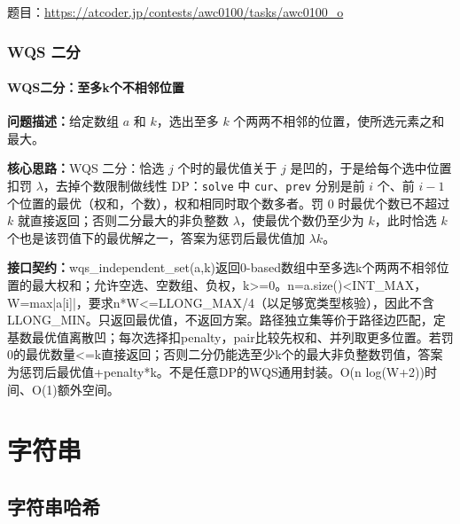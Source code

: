 题目：\url{https://atcoder.jp/contests/awc0100/tasks/awc0100_o}



\Needspace{532pt}

\section{WQS 二分}

\subsection{WQS二分：至多k个不相邻位置}\label{compact-wqs_independent_set}

\noindent\textbf{问题描述：}\allowbreak 给定数组 $a$ 和 $k$，选出至多 $k$ 个两两不相邻的位置，使所选元素之和最大。

\textbf{核心思路：}\allowbreak WQS 二分：恰选 $j$ 个时的最优值关于 $j$ 是凹的，于是给每个选中位置扣罚 $\lambda$，去掉个数限制做线性 DP：\texttt{solve} 中 \texttt{cur}、\texttt{prev} 分别是前 $i$ 个、前 $i-1$ 个位置的最优（权和，个数），权和相同时取个数多者。罚 0 时最优个数已不超过 $k$ 就直接返回；否则二分最大的非负整数 $\lambda$，使最优个数仍至少为 $k$，此时恰选 $k$ 个也是该罚值下的最优解之一，答案为惩罚后最优值加 $\lambda k$。



{\sloppy{}\noindent\textbf{接口契约：}wqs\_independent\_set(a,k)返回0-based数组中至多选k个两两不相邻位置的最大权和；允许空选、空数组、负权，k>=0。n=a.size()<INT\_MAX，W=max|a[i]|，要求n*W<=LLONG\_MAX/4（以足够宽类型核验），因此不含LLONG\_MIN。只返回最优值，不返回方案。路径独立集等价于路径边匹配，定基数最优值离散凹；每次选择扣penalty，pair比较先权和、并列取更多位置。若罚0的最优数量<=k直接返回；否则二分仍能选至少k个的最大非负整数罚值，答案为惩罚后最优值+penalty*k。不是任意DP的WQS通用封装。O(n log(W+2))时间、O(1)额外空间。\par}



\part{字符串}

\Needspace{180pt}

\chapter{字符串哈希}


